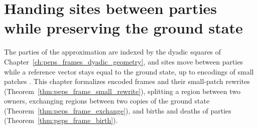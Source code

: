 \chapter{Handing sites between parties while preserving the ground state}
\label{ch:peps_frames}

The parties of the approximation are indexed by the dyadic squares of
Chapter~\ref{ch:peps_frames_dyadic_geometry}, and sites move between parties
while a reference vector stays equal to the ground state, up to encodings of
small patches \cite[Sections~6 and~7]{OpenAI2026PolynomialPEPS}. This chapter
formalizes encoded frames and their small-patch rewrites
(Theorem~\ref{thm:peps_frame_small_rewrite}), splitting a region between two
owners, exchanging regions between two copies of the ground state
(Theorem~\ref{thm:peps_frame_exchange}), and births and deaths of parties
(Theorem~\ref{thm:peps_frame_birth}).






